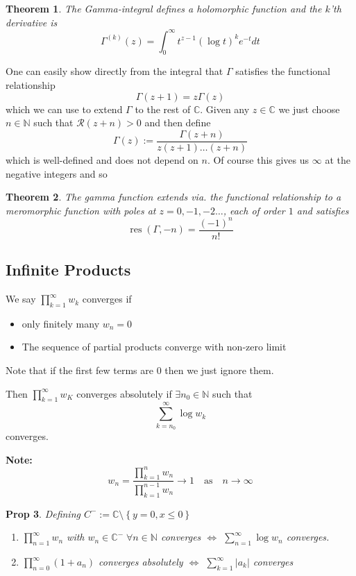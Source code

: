\documentclass[11pt]{article}
\newcommand{\defeq}{:=}
\newcommand{\abs}[1]{\left|#1\right|}
\DeclareMathOperator{\res}{\text{res}}
\newcommand{\C}{\mathbb{C}}
\newcommand{\N}{\mathbb{N}}
\newenvironment{defin}
	{\begin{mdframed}[backgroundcolor=white, roundcorner=5pt, linewidth=1pt]}
	{\end{mdframed}}
\newcommand{\mdf}[1]{{\color{red} #1}}
\newenvironment{note}
	{\begin{mdframed}[backgroundcolor=white, linecolor=red, roundcorner=5pt, linewidth=1pt]\bfseries{Note:}\normalfont}
	{\end{mdframed}}
\newtheorem{theorem}{Theorem}[section]
\newtheorem{prop}[theorem]{Prop}
\begin{document}
\begin{theorem}
The Gamma-integral defines a holomorphic function and the $k$'th derivative is
\[
	\Gamma^{(k)}(z)=\int_0^\infty t^{z-1}(\log t)^k e^{-t}dt
\]
\end{theorem}
One can easily show directly from the integral that $\Gamma$ satisfies the functional relationship
\[
	\Gamma(z+1)=z\Gamma(z)
\]
which we can use to extend $\Gamma$ to the rest of $\C$.
Given any $z\in\C$ we just choose $n\in\N$ such that $\mathcal{R}(z+n)>0$ and then define
\[
	\Gamma(z)\defeq\frac{\Gamma(z+n)}{z(z+1)\dots(z+n)}
\]
which is well-defined and does not depend on $n$.
Of course this gives us $\infty$ at the negative integers and so
\begin{theorem}
The gamma function extends via. the functional relationship to a meromorphic function with poles at $z=0, -1, -2 \dots$, each of order $1$ and satisfies
\[
	\res(\Gamma, -n)=\frac{(-1)^n}{n!}
\]
\end{theorem}
\subsection{Infinite Products}
\begin{defin}
	We say $\prod_{k=1}^\infty  w_k$ \mdf{converges} if
	\begin{itemize}
		\item only finitely many $w_n=0$
		\item The sequence of partial products converge with non-zero limit
	\end{itemize}
	Note that if the first few terms are $0$ then we just ignore them.

	Then $\prod_{k=1}^\infty w_K$ \mdf{converges absolutely} if $\exists n_0\in\N$ such that
	\[
		\sum_{k=n_0}^{\infty}\log w_k
	\]
	converges.
\end{defin}

\begin{note}
	\[
		w_n=\frac{\prod_{k=1}^n w_n}{\prod_{k=1}^{n-1} w_n}\to 1 \quad \text{as} \quad n\to\infty
	\]
\end{note}


\begin{prop}
Defining $C^-\defeq\C\setminus\left\{y=0, x\leq 0\right\}$
\begin{enumerate}[label=(\alph*)]
	\item $\prod_{n=1}^\infty w_n$ with $w_n\in\C^-\;\forall n\in\N$ converges $\iff$ $\sum_{n=1}^{\infty}\log w_n$ converges.
	\item $\prod_{n=0}^\infty(1+a_n)$ converges absolutely $\iff$ $\sum_{k=1}^\infty\abs{a_k}$ converges
\end{enumerate}
\end{prop}
\end{document}
